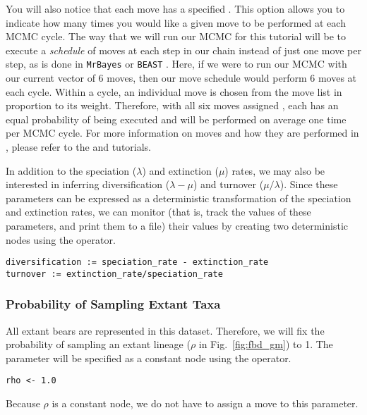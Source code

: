 You will also notice that each move has a specified . 
This option allows you to indicate how many times you would like a given move to be performed at each MCMC cycle. 
The way that we will run our MCMC for this tutorial will be to execute a \textit{schedule} of moves at each step in our chain instead of just one move per step, as is done in {\tt MrBayes} \citep{Ronquist2003} or {\tt BEAST} \citep{Drummond2012,Bouckaert2014}.
Here, if we were to run our MCMC with our current vector of 6 moves, then our move schedule would perform 6 moves at each cycle.
Within a cycle, an individual move is chosen from the move list in proportion to its weight. 
Therefore, with all six moves assigned , each has an equal probability of being executed and will be performed on average one time per MCMC cycle. 
For more information on moves and how they are performed in \RevBayes, please refer to the \href{https://github.com/revbayes/revbayes_tutorial/blob/master/tutorial_TeX/RB_MCMC_Intro_Tutorial/RB_MCMC_Intro_Tutorial.pdf}{} and \href{https://github.com/ssb2017/revbayes_intro/blob/master/tutorials/RB_CTMC_Tutorial.pdf}{} tutorials.

In addition to the speciation ($\lambda$) and extinction ($\mu$) rates, we may also be interested in inferring diversification ($\lambda - \mu$) and turnover ($\mu/\lambda$).
Since these parameters can be expressed as a deterministic transformation of the speciation and extinction rates, we can monitor (that is, track the values of these parameters, and print them to a file) their values by creating two deterministic nodes using the \cl{:=} operator.
{\tt \begin{snugshade*}
\begin{lstlisting}
diversification := speciation_rate - extinction_rate
turnover := extinction_rate/speciation_rate
\end{lstlisting}
\end{snugshade*}}

\subsubsection{Probability of Sampling Extant Taxa}\label{subsub:Exercise-FBD-Rho}

All extant bears are represented in this dataset. 
Therefore, we will fix the probability of sampling an extant lineage ($\rho$ in Fig.\ \ref{fig:fbd_gm}) to 1.
The parameter  will be specified as a constant node using the \cl{<-} operator.
{\tt \begin{snugshade*}
\begin{lstlisting}
rho <- 1.0
\end{lstlisting}
\end{snugshade*}}
Because $\rho$ is a constant node, we do not have to assign a move to this parameter.

